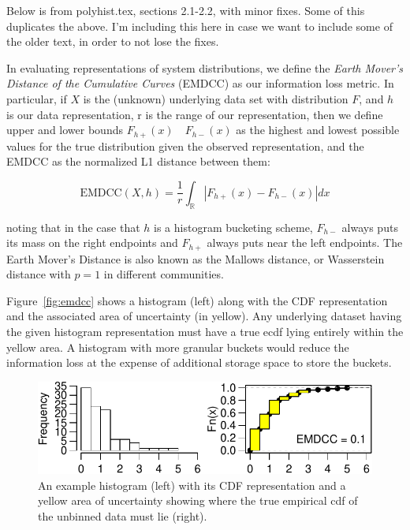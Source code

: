 \documentclass{article}
\begin{document}
Below is from polyhist.tex, sections 2.1-2.2, with minor fixes.
Some of this duplicates the above.
I'm including this here in case we want to include some of the older text,
in order to not lose the fixes.


In evaluating representations of system distributions, we define the
\emph{Earth Mover's Distance of the Cumulative Curves} (EMDCC) as our information
loss metric.  In particular, if $X$ is the (unknown) underlying data set with
distribution $F$, and $h$ is our data representation, r is the range of our representation,
then we define upper and lower bounds $F_{h+}(x) \quad F_{h-}(x)$ as the highest and lowest possible
values for the true distribution given the observed representation, and the
EMDCC as the normalized L1 distance between them:

$$ \mbox{EMDCC}(X, h) = \frac{1}{r}
    \int_{\mathbb{R}} | F_{h+}(x) - F_{h-}(x) |dx $$

\noindent noting that in the case that $h$ is a histogram bucketing scheme,
$F_{h-}$ always puts its mass on the right endpoints and $F_{h+}$ always puts
near the left endpoints.  The Earth Mover's Distance
\cite{rubner2000earth} is also known as the
Mallows distance, or Wasserstein distance with $p=1$ in
different communities.

Figure~\ref{fig:emdcc} shows a histogram (left) along with the CDF representation and the
associated area of uncertainty (in yellow).  Any underlying dataset
having the given histogram representation must have a true ecdf lying
entirely within the yellow area.  A histogram with more granular
buckets would reduce the information loss at the expense of additional
storage space to store the buckets.

\begin{figure}[h!]
\centering
\includegraphics[width=\linewidth]{exhists-crop.pdf}
\caption{An example histogram (left) with its CDF representation and a
  yellow area of uncertainty showing where the true empirical cdf of
  the unbinned data must lie (right).}
\end{figure}
\end{document}
